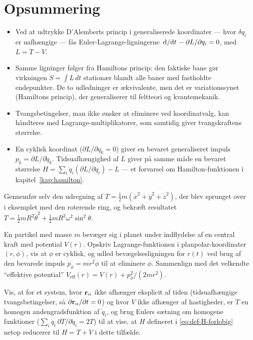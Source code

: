 \section{Opsummering}

\begin{itemize}
  \item Ved at udtrykke D'Alemberts princip i generaliserede
        koordinater — hvor $\delta q_i$ er uafhængige — fås
        Euler-Lagrange-ligningerne
        $\dv*{}{t}(\partial L/\partial\dot q_i) - \partial L/\partial q_i = 0$,
        med $L=T-V$.
  \item Samme ligninger følger fra Hamiltons princip: den faktiske bane
        gør virkningen $S=\int L\,dt$ stationær blandt alle baner med
        fastholdte endepunkter. De to udledninger er ækvivalente, men
        det er variationssynet (Hamiltons princip), der generaliserer
        til feltteori og kvantemekanik.
  \item Tvangsbetingelser, man ikke ønsker at eliminere ved
        koordinatvalg, kan håndteres med Lagrange-multiplikatorer,
        som samtidig giver tvangskraftens størrelse.
  \item En cyklisk koordinat ($\partial L/\partial q_k=0$) giver en
        bevaret generaliseret impuls $p_k=\partial L/\partial\dot q_k$.
        Tidsuafhængighed af $L$ giver på samme måde en bevaret
        størrelse $H=\sum_i\dot q_i(\partial L/\partial\dot q_i)-L$ —
        et forvarsel om Hamilton-funktionen i
        kapitel~\ref{kap:hamilton}.
\end{itemize}

\begin{opgave}
Gennemfør selv den udregning af $T=\frac12 m(\dot x^2+\dot y^2+\dot z^2)$,
der blev sprunget over i eksemplet med den roterende ring, og
bekræft resultatet $T=\frac12 mR^2\dot\theta^2+\frac12 mR^2\omega^2\sin^2\theta$.
\end{opgave}

\begin{opgave}
En partikel med masse $m$ bevæger sig i planet under indflydelse af en
central kraft med potential $V(r)$. Opskriv Lagrange-funktionen i
planpolar-koordinater $(r,\phi)$, vis at $\phi$ er cyklisk, og udled
bevægelsesligningen for $r(t)$ ved brug af den bevarede impuls
$p_\phi=mr^2\dot\phi$ til at eliminere $\dot\phi$. Sammenlign med det
velkendte ``effektive potential'' $V_\text{eff}(r)=V(r)+p_\phi^2/(2mr^2)$.
\end{opgave}

\begin{opgave}
Vis, at for et system, hvor $\vb{r}_\alpha$ ikke afhænger eksplicit af
tiden (tidsuafhængige tvangsbetingelser, så $\partial\vb{r}_\alpha/\partial t=0$)
og hvor $V$ ikke afhænger af hastigheder, er $T$ en homogen
andengradsfunktion af $\dot q_i$, og brug Eulers sætning om homogene
funktioner ($\sum_i \dot q_i\,\partial T/\partial \dot q_i = 2T$) til at
vise, at $H$ defineret i \eqref{eq:def-H-forlobig} netop reducerer til
$H=T+V$ i dette tilfælde.
\end{opgave}
